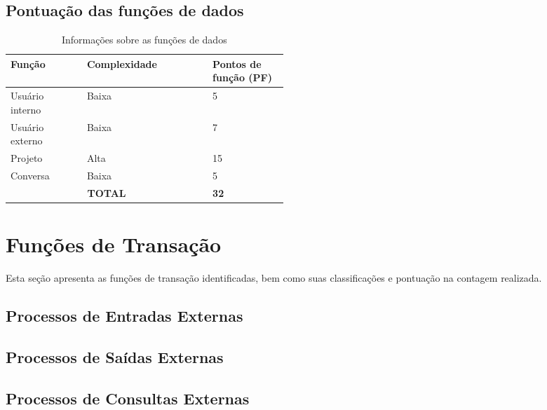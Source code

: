   \subsection{Pontuação das funções de dados}
  
      \begin{table}[!h]
      \centering
      \caption{Informações sobre as funções de dados}
      \label{funcoes_dados}
	\begin{tabular}{|p{0.12\linewidth}|p{0.20\linewidth}|p{0.14\linewidth}|}
	\hline
	\textbf{Função} & \textbf{Complexidade} & \textbf{Pontos de função (PF)} \\
	\hline
	Usuário interno & Baixa & 5 \\
	\hline
	Usuário externo & Baixa & 7 \\
	\hline
	Projeto & Alta & 15 \\
	\hline
	Conversa & Baixa & 5 \\
	\hline
	\multicolumn{2}{|c|}{\textbf{TOTAL}} & \textbf{32} \\ \cline{3-3}
	\hline
	\end{tabular}
      \end{table}

\vfill
\pagebreak
\section{Funções de Transação}
  
 Esta seção apresenta as funções de transação identificadas, bem como suas classificações e pontuação na contagem realizada.
  
  \subsection{Processos de Entradas Externas}
  
    
  
  \subsection{Processos de Saídas Externas}
    
    

  \subsection{Processos de Consultas Externas}
    
    
    
